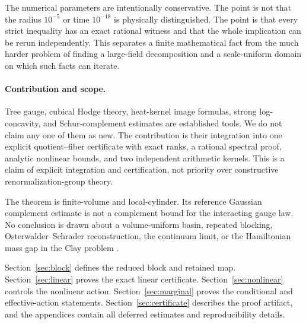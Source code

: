 The numerical parameters are intentionally conservative.  The point is not
that the radius $10^{-5}$ or time $10^{-18}$ is physically distinguished.  The
point is that every strict inequality has an exact rational witness and that
the whole implication can be rerun independently.  This separates a finite
mathematical fact from the much harder problem of finding a large-field
decomposition and a scale-uniform domain on which such facts can iterate.

\paragraph{Contribution and scope.}
Tree gauge, cubical Hodge theory, heat-kernel image formulas, strong
log-concavity, and Schur-complement estimates are established tools.  We do not
claim any one of them as new.  The contribution is their integration into one
explicit quotient--fiber certificate with exact ranks, a rational spectral
proof, analytic nonlinear bounds, and two independent arithmetic kernels.
This is a claim of explicit integration and certification, not priority over
constructive renormalization-group theory.

The theorem is finite-volume and local-cylinder.  Its reference Gaussian
complement estimate is not a complement bound for the interacting gauge law.
No conclusion is drawn about a volume-uniform basin, repeated blocking,
Osterwalder--Schrader reconstruction, the continuum limit, or the Hamiltonian
mass gap in the Clay problem \cite{JaffeWitten2000}.

Section~\ref{sec:block} defines the reduced block and retained map.
Section~\ref{sec:linear} proves the exact linear certificate.
Section~\ref{sec:nonlinear} controls the nonlinear action.
Section~\ref{sec:marginal} proves the conditional and effective-action
statements.  Section~\ref{sec:certificate} describes the proof artifact, and
the appendices contain all deferred estimates and reproducibility details.
